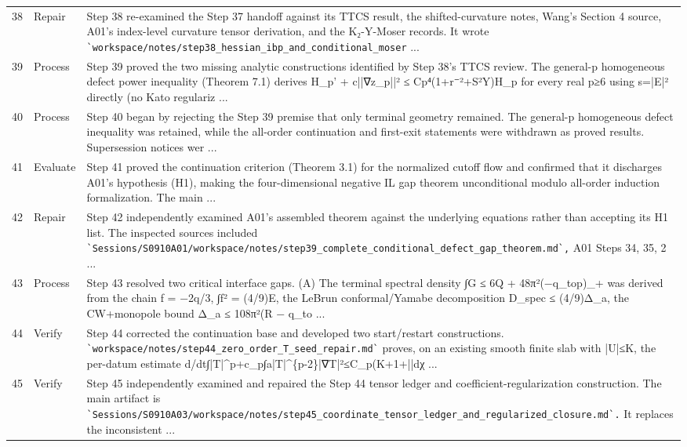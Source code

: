 \documentclass[UTF8,fontset=fandol,zihao=-4]{ctexart}
\begin{document}
\begin{longtable}{r p{} >{\raggedright\arraybackslash}p{}}
38 & Repair & Step 38 re-examined the Step 37 handoff against its TTCS result, the shifted-curvature notes, Wang's Section 4 source, A01's index-level curvature tensor derivation, and the K₂-Y-Moser records. It wrote \nolinkurl{`workspace/notes/step38_hessian_ibp_and_conditional_moser} ...\\
39 & Process & Step 39 proved the two missing analytic constructions identified by Step 38's TTCS review. The general-p homogeneous defect power inequality (Theorem 7.1) derives H\_p' + c||∇z\_p||² ≤ Cp⁴(1+r⁻²+S²Y)H\_p for every real p≥6 using s=|E|² directly (no Kato regulariz ...\\
40 & Process & Step 40 began by rejecting the Step 39 premise that only terminal geometry remained. The general-p homogeneous defect inequality was retained, while the all-order continuation and first-exit statements were withdrawn as proved results. Supersession notices wer ...\\
41 & Evaluate & Step 41 proved the continuation criterion (Theorem 3.1) for the normalized cutoff flow and confirmed that it discharges A01's hypothesis (H1), making the four-dimensional negative IL gap theorem unconditional modulo all-order induction formalization. The main  ...\\
42 & Repair & Step 42 independently examined A01’s assembled theorem against the underlying equations rather than accepting its H1 list. The inspected sources included \nolinkurl{`Sessions/S0910A01/workspace/notes/step39_complete_conditional_defect_gap_theorem.md`,} A01 Steps 34, 35, 2 ...\\
43 & Process & Step 43 resolved two critical interface gaps. (A) The terminal spectral density ∫G ≤ 6Q + 48π²(−q\_top)\_+ was derived from the chain f = −2q/3, ∫f² = (4/9)E, the LeBrun conformal/Yamabe decomposition D\_spec ≤ (4/9)Δ\_a, the CW+monopole bound Δ\_a ≤ 108π²(R − q\_to ...\\
44 & Verify & Step 44 corrected the continuation base and developed two start/restart constructions. \nolinkurl{`workspace/notes/step44_zero_order_T_seed_repair.md`} proves, on an existing smooth finite slab with |U|≤K, the per-datum estimate d/dt∫|T|\textasciicircum{}p+c\_p∫a|T|\textasciicircum{}\{p-2\}|∇T|²≤C\_p(K+1+||dχ ...\\
45 & Verify & Step 45 independently examined and repaired the Step 44 tensor ledger and coefficient-regularization construction. The main artifact is \nolinkurl{`Sessions/S0910A03/workspace/notes/step45_coordinate_tensor_ledger_and_regularized_closure.md`.} It replaces the inconsistent ...\\

\end{longtable}
\end{document}

